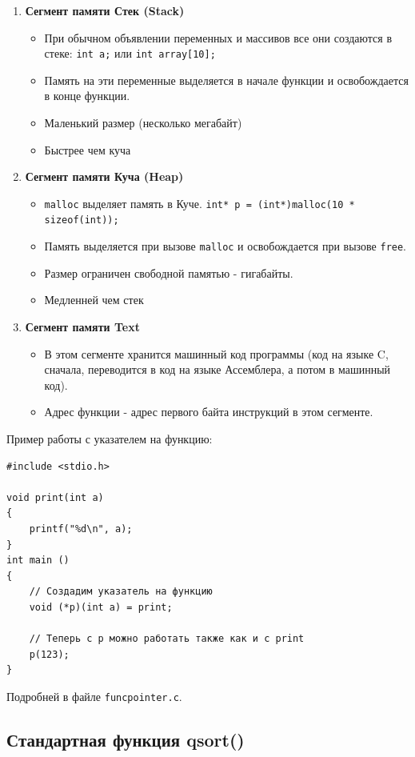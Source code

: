 \documentclass{article}
\begin{document}
\begin{enumerate}
\item \textbf{Сегмент памяти Стек (Stack)} \\
\begin{itemize}
\item При обычном объявлении переменных и массивов все они создаются в стеке: \texttt{int a;} или \texttt{int array[10];}
\item Память на эти переменные выделяется в начале функции и освобождается в конце функции.
\item Маленький размер (несколько мегабайт)
\item Быстрее чем куча
\end{itemize}
\item \textbf{Сегмент памяти Куча (Heap)} \\
\begin{itemize}
\item \texttt{malloc} выделяет память в Куче. \texttt{int* p = (int*)malloc(10 * sizeof(int));}
\item Память выделяется при вызове \texttt{malloc} и освобождается при вызове \texttt{free}.
\item Размер ограничен свободной памятью - гигабайты.
\item Медленней чем стек
\end{itemize}
\item \textbf{Сегмент памяти Text} \\
\begin{itemize}
\item В этом сегменте хранится машинный код программы (код на языке C, сначала, переводится в код на языке Ассемблера, а потом в машинный код).
\item Адрес функции - адрес первого байта инструкций в этом сегменте.
\end{itemize}
\end{enumerate}

Пример работы с указателем на функцию:
\begin{lstlisting}
#include <stdio.h>

void print(int a)
{
    printf("%d\n", a);
}
int main ()
{
    // Создадим указатель на функцию
    void (*p)(int a) = print;
    
    // Теперь с p можно работать также как и с print
    p(123);
}
\end{lstlisting}
Подробней в файле \texttt{funcpointer.c}.

\subsection*{Стандартная функция qsort()}
\end{document}
